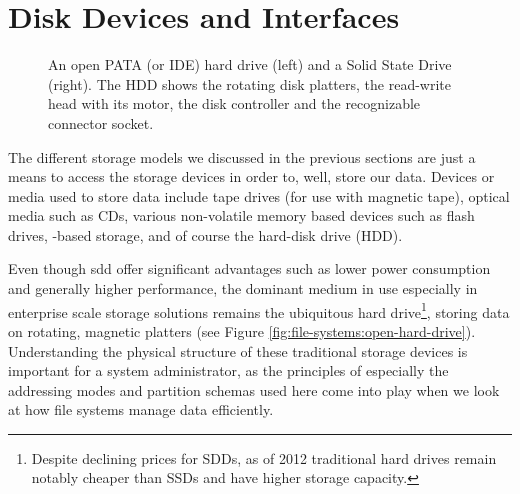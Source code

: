 \section{Disk Devices and Interfaces}
\label{file systems:disk-devices-interface}

\begin{figure}[t]
	\centering
	\hspace{7em}
	\caption[HDD vs. SSD]{An open PATA (or IDE) hard drive (left) and
			a Solid State Drive (right).
			The HDD shows the rotating disk platters, the read-write
			head with its motor, the disk controller and
			the recognizable connector socket.
			\label{fig:file-systems:hdd-vs-ssd}}
\end{figure}



The different storage models we discussed in the
previous sections are just a means to access the
storage devices in order to, well, store our data.
Devices or media used to store data include tape
drives (for use with magnetic tape), optical media
such as CDs, various non-volatile memory based devices
such as flash drives,
-based storage, and of
course the hard-disk drive
(HDD).

Even though \gls{sdd} offer significant
advantages such as lower power consumption and
generally higher performance, the dominant medium in
use especially in enterprise scale storage solutions
remains the ubiquitous hard drive\footnote{Despite
declining prices for SDDs, as of 2012 traditional hard
drives remain notably cheaper than SSDs and have
higher storage capacity.}, storing data on rotating,
magnetic platters (see Figure
\ref{fig:file-systems:open-hard-drive}).
Understanding the physical structure of these
traditional storage devices is important for a system
administrator, as the principles of especially the
addressing modes and partition schemas used here come
into play when we look at how file systems manage data
efficiently.


